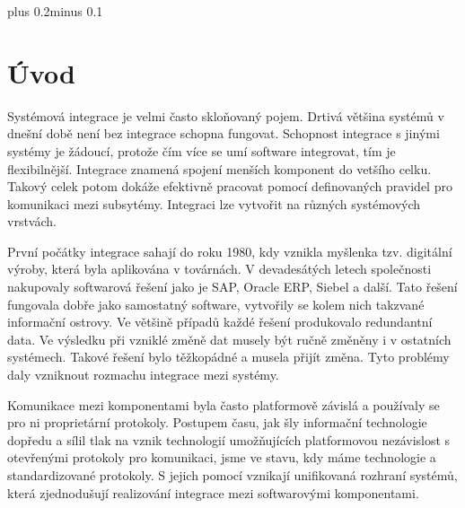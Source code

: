 \documentclass[11pt,twoside,a4paper]{book}
\begin{document}
\mainbodystarts
\normalfont
{}\baselineskip plus 0.2\baselineskip minus 0.1\baselineskip



% 
% 

% 
\chapter{Úvod}
Systémová integrace je velmi často skloňovaný pojem. Drtivá většina systémů v dnešní době
není bez integrace schopna fungovat. Schopnost integrace s jinými systémy je žádoucí,
protože čím více se umí software integrovat, tím je flexibilnější. Integrace znamená spojení
menších komponent do vetšího celku. Takový celek potom dokáže efektivně pracovat pomocí
definovaných pravidel pro komunikaci mezi subsytémy. Integraci lze vytvořit na různých
systémových vrstvách.

První počátky integrace sahají do roku 1980, kdy vznikla myšlenka tzv. digitální výroby, která
byla aplikována v továrnách. V devadesátých letech společnosti nakupovaly softwarová řešení
jako je SAP, Oracle ERP, Siebel a další. Tato řešení fungovala dobře jako samostatný
software, vytvořily se kolem nich takzvané informační ostrovy. Ve většině případů každé
řešení produkovalo redundantní data. Ve výsledku při vzniklé změně dat musely být ručně
změněny i v ostatních systémech. Takové řešení bylo těžkopádné a musela přijít změna. Tyto
problémy daly vzniknout rozmachu integrace mezi systémy.

Komunikace mezi komponentami byla často platformově závislá a používaly se pro ni
proprietární protokoly. Postupem času, jak šly informační technologie dopředu a sílil tlak na
vznik technologií umožňujících platformovou nezávislost s otevřenými protokoly pro
komunikaci, jsme ve stavu, kdy máme technologie a standardizované protokoly. S jejich
pomocí vznikají unifikovaná rozhraní systémů, která zjednodušují realizování integrace mezi
softwarovými komponentami.
\end{document}
